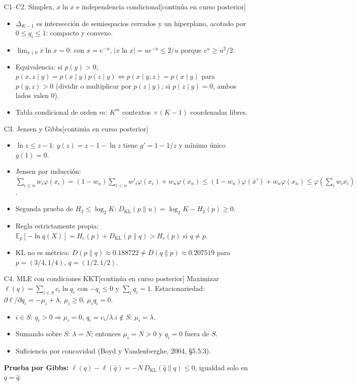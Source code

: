 \documentclass[aspectratio=169,10pt]{beamer}
\newcommand{\posterior}{\hfill{\scriptsize\color{vino}[continúa en curso posterior]}}
\begin{document}
\begin{frame}{C1--C2. Símplex, $x\ln x$ e independencia condicional\posterior}
\small
\begin{itemize}
\item $\Delta_{K-1}$ es intersección de semiespacios cerrados y un hiperplano, acotado por $0\le q_i\le1$: compacto y convexo.
\item $\lim_{x\downarrow0}x\ln x=0$: con $x=e^{-u}$, $|x\ln x|=ue^{-u}\le 2/u$ porque $e^u\ge u^2/2$.
\item Equivalencia: si $p(y)>0$, $p(x,z\mid y)=p(x\mid y)p(z\mid y)\iff p(x\mid y,z)=p(x\mid y)$ para $p(y,z)>0$ (dividir o multiplicar por $p(z\mid y)$; si $p(z\mid y)=0$, ambos lados valen 0).
\item Tabla condicional de orden $m$: $K^m$ contextos $\times(K-1)$ coordenadas libres.
\end{itemize}
\end{frame}

\begin{frame}{C3. Jensen y Gibbs\posterior}
\small
\begin{itemize}
\item $\ln z\le z-1$: $g(z)=z-1-\ln z$ tiene $g'=1-1/z$ y mínimo único $g(1)=0$.
\item Jensen por inducción: $\sum_{i\le n}w_i\varphi(x_i)=(1-w_n)\sum_{i<n}w'_i\varphi(x_i)+w_n\varphi(x_n)\le(1-w_n)\varphi(\bar x')+w_n\varphi(x_n)\le\varphi(\sum_iw_ix_i)$.
\item Segunda prueba de $H_2\le\log_2K$: $D_{\mathrm{KL}}(p\|u)=\log_2K-H_2(p)\ge0$.
\item Regla estrictamente propia: $\mathbb E_p[-\ln q(X)]=H_e(p)+D_{\mathrm{KL}}(p\|q)>H_e(p)$ si $q\ne p$.
\item KL no es métrica: $D(p\|q)\approx0.188722\neq D(q\|p)\approx0.207519$ para $p=(3/4,1/4)$, $q=(1/2,1/2)$.
\end{itemize}
\end{frame}

\begin{frame}{C4. MLE con condiciones KKT\posterior}
\small
Maximizar $\ell(q)=\sum_{i\in S}c_i\ln q_i$ con $-q_i\le0$ y $\sum_iq_i=1$. Estacionariedad:
$\partial\ell/\partial q_i=-\mu_i+\lambda$, $\mu_i\ge0$, $\mu_iq_i=0$.
\begin{itemize}
\item $i\in S$: $q_i>0\Rightarrow\mu_i=0$, $q_i=c_i/\lambda$.\quad $i\notin S$: $\mu_i=\lambda$.
\item Sumando sobre $S$: $\lambda=N$; entonces $\mu_i=N>0$ y $q_i=0$ fuera de $S$.
\item Suficiencia por concavidad (Boyd y Vandenberghe, 2004, §5.5.3).
\end{itemize}
\textbf{Prueba por Gibbs:} $\ell(q)-\ell(\widehat q)=-N\,D_{\mathrm{KL}}(\widehat q\|q)\le0$, igualdad solo en $q=\widehat q$.
\end{frame}
\end{document}
